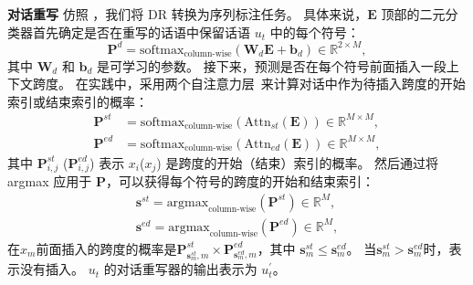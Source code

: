 \noindent\textbf{对话重写 } 仿照 \citet{hao2021rast}，我们将 DR 转换为序列标注任务。 具体来说，$\mathbf{E}$ 顶部的二元分类器首先确定是否在重写的话语中保留话语 $u_t$ 中的每个符号：
\begin{equation}
    \mathbf{P}^d=\textrm{softmax}_{\textrm{column-wise}}(\mathbf{W}_d\mathbf{E} + \mathbf{b}_d) \in \mathbb{R}^{2 \times M}, \nonumber
\end{equation}
其中 $\mathbf{W}_d$ 和 $\mathbf{b}_d$ 是可学习的参数。 接下来，预测是否在每个符号前面插入一段上下文跨度。 在实践中，采用两个自注意力层~\cite{vaswani2017attention}来计算对话中作为待插入跨度的开始索引或结束索引的概率：
\begin{align}
    \mathbf{P}^{st} &= \textrm{softmax}_{\textrm{column-wise}}(\textrm{Attn}_{st}(\mathbf{E})) \in \mathbb{R}^{M \times M}, \nonumber \\
    \mathbf{P}^{ed} &= \textrm{softmax}_{\textrm{column-wise}}(\textrm{Attn}_{ed}(\mathbf{E}))\in \mathbb{R}^{M \times M}, \nonumber
\end{align}
其中 $\mathbf{P}^{st}_{i,j}$ ($\mathbf{P}^{ed}_{i,j}$) 表示 $x_i$($x_j$) 是跨度的开始（结束）索引的概率。 然后通过将 argmax 应用于 $\mathbf{P}$，可以获得每个符号的跨度的开始和结束索引：
\begin{align}
    \mathbf{s}^{st} = \textrm{argmax}_{\textrm{column-wise}}(\mathbf{P}^{st}) \in \mathbb{R}^{M}, \nonumber \\
    \mathbf{s}^{ed} = \textrm{argmax}_{\textrm{column-wise}}(\mathbf{P}^{ed}) \nonumber \in \mathbb{R}^{M},
\end{align}
在$x_m$前面插入的跨度的概率是$\mathbf{P}^{st}_{\mathbf{s}_m^{st},m} \times \mathbf{P}^{ed }_{\mathbf{s}_m^{ed},m}$，其中 $\mathbf{s}_m^{st} \leqslant \mathbf{s}_m^{ed}$。 当$\mathbf{s}_m^{st} > \mathbf{s}_m^{ed}$时，表示没有插入。 $u_t$ 的对话重写器的输出表示为 $u_t^{\prime}$。

